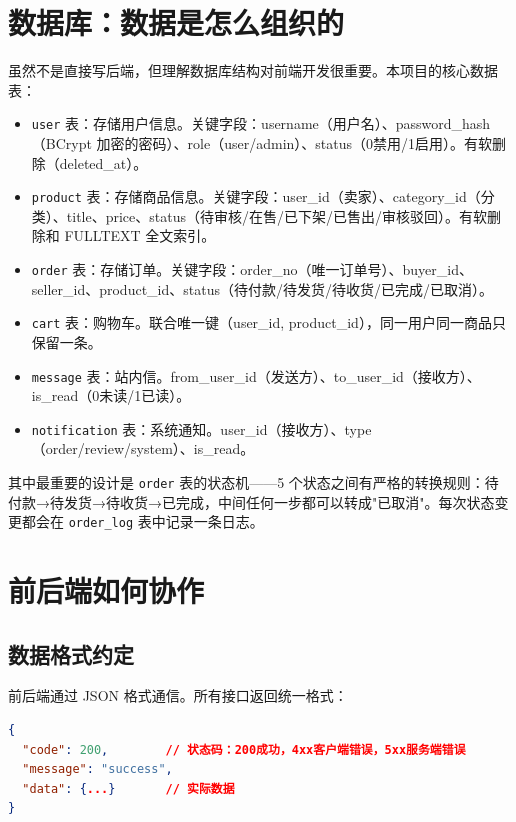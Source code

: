 \documentclass[12pt,a4paper]{ctexart}
\begin{document}
\section{数据库：数据是怎么组织的}

虽然不是直接写后端，但理解数据库结构对前端开发很重要。本项目的核心数据表：

\begin{itemize}
  \item \texttt{user} 表：存储用户信息。关键字段：username（用户名）、password\_hash（BCrypt 加密的密码）、role（user/admin）、status（0禁用/1启用）。有软删除（deleted\_at）。
  \item \texttt{product} 表：存储商品信息。关键字段：user\_id（卖家）、category\_id（分类）、title、price、status（待审核/在售/已下架/已售出/审核驳回）。有软删除和 FULLTEXT 全文索引。
  \item \texttt{order} 表：存储订单。关键字段：order\_no（唯一订单号）、buyer\_id、seller\_id、product\_id、status（待付款/待发货/待收货/已完成/已取消）。
  \item \texttt{cart} 表：购物车。联合唯一键（user\_id, product\_id），同一用户同一商品只保留一条。
  \item \texttt{message} 表：站内信。from\_user\_id（发送方）、to\_user\_id（接收方）、is\_read（0未读/1已读）。
  \item \texttt{notification} 表：系统通知。user\_id（接收方）、type（order/review/system）、is\_read。
\end{itemize}

其中最重要的设计是 \texttt{order} 表的状态机——5 个状态之间有严格的转换规则：待付款→待发货→待收货→已完成，中间任何一步都可以转成"已取消"。每次状态变更都会在 \texttt{order\_log} 表中记录一条日志。

\section{前后端如何协作}

\subsection{数据格式约定}

前后端通过 JSON 格式通信。所有接口返回统一格式：

\begin{lstlisting}[language=JSON]
{
  "code": 200,        // 状态码：200成功，4xx客户端错误，5xx服务端错误
  "message": "success",
  "data": {...}       // 实际数据
}
\end{lstlisting}
\end{document}
